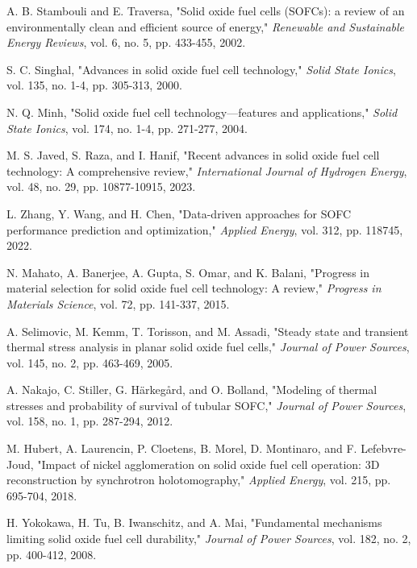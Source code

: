 \documentclass[11pt,a4paper]{article}
\begin{document}
\begin{thebibliography}{99}

A. B. Stambouli and E. Traversa, "Solid oxide fuel cells (SOFCs): a review of an environmentally clean and efficient source of energy," \textit{Renewable and Sustainable Energy Reviews}, vol. 6, no. 5, pp. 433-455, 2002.

S. C. Singhal, "Advances in solid oxide fuel cell technology," \textit{Solid State Ionics}, vol. 135, no. 1-4, pp. 305-313, 2000.

N. Q. Minh, "Solid oxide fuel cell technology—features and applications," \textit{Solid State Ionics}, vol. 174, no. 1-4, pp. 271-277, 2004.

M. S. Javed, S. Raza, and I. Hanif, "Recent advances in solid oxide fuel cell technology: A comprehensive review," \textit{International Journal of Hydrogen Energy}, vol. 48, no. 29, pp. 10877-10915, 2023.

L. Zhang, Y. Wang, and H. Chen, "Data-driven approaches for SOFC performance prediction and optimization," \textit{Applied Energy}, vol. 312, pp. 118745, 2022.

N. Mahato, A. Banerjee, A. Gupta, S. Omar, and K. Balani, "Progress in material selection for solid oxide fuel cell technology: A review," \textit{Progress in Materials Science}, vol. 72, pp. 141-337, 2015.

A. Selimovic, M. Kemm, T. Torisson, and M. Assadi, "Steady state and transient thermal stress analysis in planar solid oxide fuel cells," \textit{Journal of Power Sources}, vol. 145, no. 2, pp. 463-469, 2005.

A. Nakajo, C. Stiller, G. Härkegård, and O. Bolland, "Modeling of thermal stresses and probability of survival of tubular SOFC," \textit{Journal of Power Sources}, vol. 158, no. 1, pp. 287-294, 2012.

M. Hubert, A. Laurencin, P. Cloetens, B. Morel, D. Montinaro, and F. Lefebvre-Joud, "Impact of nickel agglomeration on solid oxide fuel cell operation: 3D reconstruction by synchrotron holotomography," \textit{Applied Energy}, vol. 215, pp. 695-704, 2018.

H. Yokokawa, H. Tu, B. Iwanschitz, and A. Mai, "Fundamental mechanisms limiting solid oxide fuel cell durability," \textit{Journal of Power Sources}, vol. 182, no. 2, pp. 400-412, 2008.

\end{thebibliography}
\end{document}

